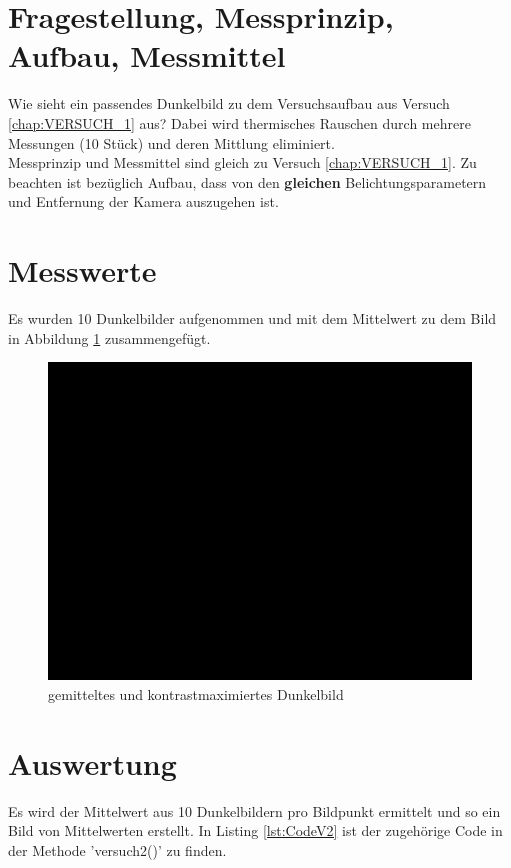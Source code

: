 \documentclass[12pt,oneside,a4paper]{report}
\begin{document}
\section{Fragestellung, Messprinzip, Aufbau, Messmittel}
\label{chap:VERSUCH_2_FRAGESTELLUNG}
Wie sieht ein passendes Dunkelbild zu dem Versuchsaufbau aus Versuch \ref{chap:VERSUCH_1} aus? Dabei wird thermisches Rauschen durch mehrere Messungen (10 Stück) und deren Mittlung eliminiert.\\
Messprinzip und Messmittel sind gleich zu Versuch \ref{chap:VERSUCH_1}.
Zu beachten ist bezüglich Aufbau, dass von den \textbf{gleichen} Belichtungsparametern und Entfernung der Kamera auszugehen ist.

\section{Messwerte}
\label{chap:VERSUCH_2_MESSWERTE}
Es wurden 10 Dunkelbilder aufgenommen und mit dem Mittelwert zu dem Bild in Abbildung \ref{fig:DunkelBildMittel} zusammengefügt.

\begin{figure}[H]
	\centering\small
	\includegraphics[width=\textwidth]{src/DunkelbildContrastMax.png}
	\caption{gemitteltes und kontrastmaximiertes Dunkelbild}
	\label{fig:DunkelBildMittel}
\end{figure}

\section{Auswertung}
\label{chap:VERSUCH_2_AUSWERTUNG}
Es wird der Mittelwert aus 10 Dunkelbildern pro Bildpunkt ermittelt und so ein Bild von Mittelwerten erstellt.
In Listing \ref{lst:CodeV2} ist der zugehörige Code in der Methode 'versuch2()' zu finden.
\end{document}
